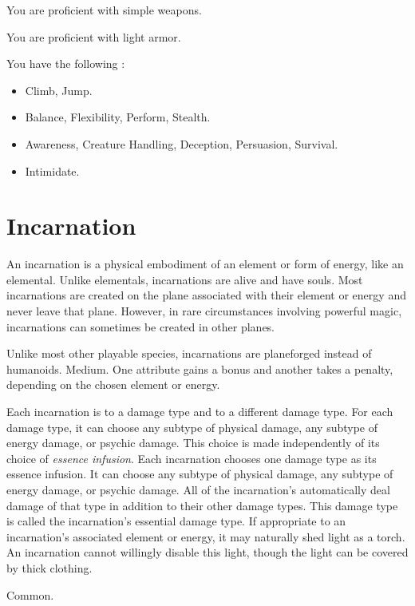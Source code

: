         You are proficient with simple weapons.

        You are proficient with light armor.

        You have the following :
        \begin{itemize}
            \item {} Climb, Jump.
            \item {} Balance, Flexibility, Perform, Stealth.
            \item {} Awareness, Creature Handling, Deception, Persuasion, Survival.
            \item {} Intimidate.
        \end{itemize}

\section{Incarnation}

    An incarnation is a physical embodiment of an element or form of energy, like an elemental.
    Unlike elementals, incarnations are alive and have souls.
    Most incarnations are created on the plane associated with their element or energy and never leave that plane.
    However, in rare circumstances involving powerful magic, incarnations can sometimes be created in other planes.

     Unlike most other playable species, incarnations are planeforged instead of humanoids.
     Medium.
     One attribute gains a  bonus and another takes a  penalty, depending on the chosen element or energy.
    \begin{itemize}
         Each incarnation is \impervious to a damage type and \vulnerable to a different damage type.
        For each damage type, it can choose any subtype of physical damage, any subtype of energy damage, or psychic damage.
        This choice is made independently of its choice of \textit{essence infusion}.
         Each incarnation chooses one damage type as its essence infusion.
        It can choose any subtype of physical damage, any subtype of energy damage, or psychic damage.
        All of the incarnation's  automatically deal damage of that type in addition to their other damage types.
        This damage type is called the incarnation's essential damage type.
         If appropriate to an incarnation's associated element or energy, it may naturally shed light as a torch.
        An incarnation cannot willingly disable this light, though the light can be covered by thick clothing.
    \end{itemize}
     Common.

